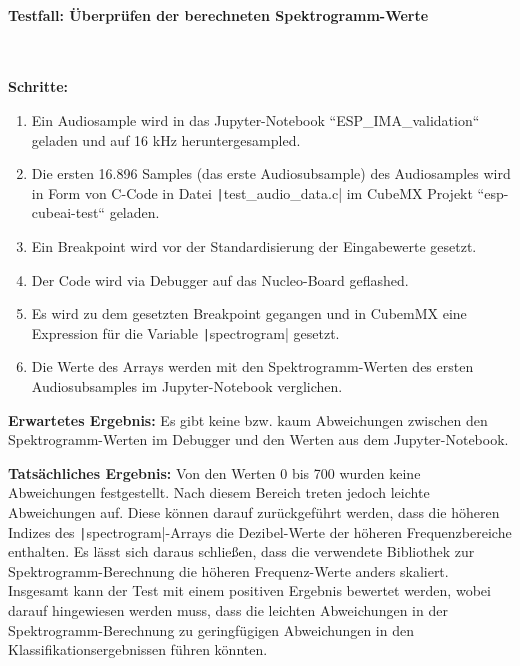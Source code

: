 \paragraph{Testfall: Überprüfen der berechneten Spektrogramm-Werte}\mbox{}\\
\begin{adjustwidth}{0.5cm}{0cm}
\textbf{Schritte:}
\begin{enumerate}
	\item Ein Audiosample wird in das Jupyter-Notebook ``ESP\_IMA\_validation`` geladen und auf 16 kHz heruntergesampled.
	\item Die ersten 16.896 Samples (das erste Audiosubsample) des Audiosamples wird in Form von C-Code in Datei \texttt|test_audio_data.c| im CubeMX Projekt ``esp-cubeai-test`` geladen.
	\item Ein Breakpoint wird vor der Standardisierung der Eingabewerte gesetzt.
	\item Der Code wird via Debugger auf das Nucleo-Board geflashed.
	\item Es wird zu dem gesetzten Breakpoint gegangen und in CubemMX eine Expression für die Variable \texttt|spectrogram| gesetzt.
	\item Die Werte des Arrays werden mit den Spektrogramm-Werten des ersten Audiosubsamples im Jupyter-Notebook verglichen.
\end{enumerate}

\textbf{Erwartetes Ergebnis:} 
Es gibt keine bzw. kaum Abweichungen zwischen den Spektrogramm-Werten im Debugger  und den Werten aus dem Jupyter-Notebook.

\textbf{Tatsächliches Ergebnis:}
Von den Werten 0 bis 700 wurden keine Abweichungen festgestellt. Nach diesem Bereich treten jedoch leichte Abweichungen auf. Diese können darauf zurückgeführt werden, dass die höheren Indizes des \texttt|spectrogram|-Arrays die Dezibel-Werte der höheren Frequenzbereiche enthalten. Es lässt sich daraus schließen, dass die verwendete Bibliothek zur Spektrogramm-Berechnung die höheren Frequenz-Werte anders skaliert. Insgesamt kann der Test mit einem positiven Ergebnis bewertet werden, wobei darauf hingewiesen werden muss, dass die leichten Abweichungen in der Spektrogramm-Berechnung zu geringfügigen Abweichungen in den Klassifikationsergebnissen führen könnten.
\end{adjustwidth}


